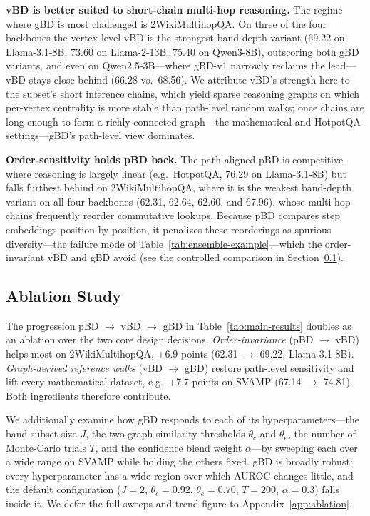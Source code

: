 \documentclass[twoside]{article}
\begin{document}
\textbf{vBD is better suited to short-chain multi-hop reasoning.} The regime where
gBD is most challenged is 2WikiMultihopQA. On three of the four backbones the
vertex-level vBD is the strongest band-depth variant (69.22 on Llama-3.1-8B, 73.60
on Llama-2-13B, 75.40 on Qwen3-8B), outscoring both gBD variants, and even on
Qwen2.5-3B---where
gBD-v1 narrowly reclaims the lead---vBD stays close behind (66.28 vs.\ 68.56). We
attribute vBD's strength here to the subset's short inference chains, which yield
sparse reasoning graphs on which per-vertex centrality is more stable than
path-level random walks; once chains are long enough to form a richly connected
graph---the mathematical and HotpotQA settings---gBD's path-level view dominates.

\textbf{Order-sensitivity holds pBD back.} The path-aligned pBD is competitive
where reasoning is largely linear (e.g.\ HotpotQA, 76.29 on Llama-3.1-8B) but
falls furthest behind on 2WikiMultihopQA, where it is the weakest band-depth
variant on all four backbones (62.31, 62.64, 62.60, and 67.96), whose multi-hop
chains frequently reorder commutative lookups. Because pBD compares step
embeddings position by position, it penalizes these reorderings as spurious
diversity---the failure mode of Table~\ref{tab:ensemble-example}---which the
order-invariant vBD and gBD avoid (see the controlled comparison in
Section~\ref{sec:exp:ablation}).

\subsection{Ablation Study}
\label{sec:exp:ablation}

The progression pBD $\rightarrow$ vBD $\rightarrow$ gBD in
Table~\ref{tab:main-results} doubles as an ablation over the two core design
decisions. \emph{Order-invariance} (pBD $\rightarrow$ vBD) helps most on
2WikiMultihopQA, +6.9 points (62.31 $\rightarrow$ 69.22, Llama-3.1-8B).
\emph{Graph-derived reference walks} (vBD $\rightarrow$ gBD) restore path-level
sensitivity and lift every mathematical dataset, e.g.\ +7.7 points on SVAMP
(67.14 $\rightarrow$ 74.81). Both ingredients therefore contribute.

We additionally examine how gBD responds to each of its hyperparameters---the band
subset size $J$, the two graph similarity thresholds $\theta_c$ and $\theta_e$, the
number of Monte-Carlo trials $T$, and the confidence blend weight $\alpha$---by
sweeping each over a wide range on SVAMP while holding the others fixed. gBD is
broadly robust: every hyperparameter has a wide region over which AUROC changes
little, and the default configuration ($J{=}2$, $\theta_c{=}0.92$, $\theta_e{=}0.70$,
$T{=}200$, $\alpha{=}0.3$) falls inside it. We defer the full sweeps and trend figure
to Appendix~\ref{app:ablation}.
\end{document}
